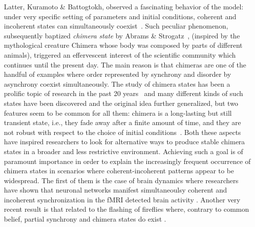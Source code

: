 \documentclass[prx,twocolumn,amsmath,noshowkeys,noshowpacs,amssymb]{revtex4-2}
\begin{document}
Latter, Kuramoto \& Battogtokh, observed a fascinating behavior of the model: {under very specific setting of parameters and initial conditions}, coherent and incoherent states can simultaneously coexist~\cite{chimera}. Such peculiar phenomenon, subsequently baptized \emph{chimera state} by Abrams \& Strogatz~\cite{Abrams_Strogatz}, (inspired by the mythological creature Chimera whose body was composed by parts of different animals), triggered an effervescent interest of the scientific community which continues until {the present day}. The main reason is that chimeras are one of the handful of examples where order represented by synchrony and disorder by asynchrony coexist simultaneously.
The study of chimera states has been a prolific topic of research in the past 20 years~\cite{Panaggio_2015} and many different kinds of such states have been discovered and the original idea further generalized, but two features seem to be common for all them: chimera is a long-lasting but still transient state, i.e., they fade away after a finite amount of time, and they are not robust with respect to the choice of initial conditions~\cite{zakharova_chimera_2020}. Both these aspects have inspired researchers to look for alternative ways to produce stable chimera states in a broader and less restrictive environment. {Achieving such a goal is of paramount importance in order to explain the increasingly frequent occurrence of chimera states in scenarios where coherent-incoherent patterns appear to be widespread.} The first of them is the case of brain dynamics where researchers have shown that neuronal networks manifest simultaneoulsy coherent and incoherent synchronization in the fMRI detected brain activity \cite{chimera_brain}. Another very recent result is that related to the flashing of fireflies where, contrary to common belief, partial synchrony and chimera states do exist \cite{chimera_firefly}.   
\end{document}
